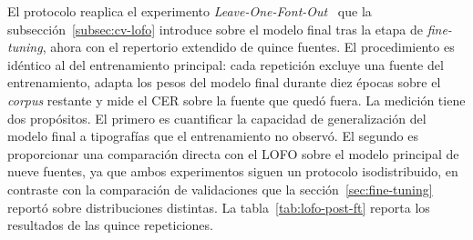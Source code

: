 El protocolo reaplica el experimento \textit{Leave-One-Font-Out}~\cite{etter2019synthrecipe} que la subsección~\ref{subsec:cv-lofo} introduce sobre el modelo final tras la etapa de \textit{fine-tuning}, ahora con el repertorio extendido de quince fuentes. El procedimiento es idéntico al del entrenamiento principal: cada repetición excluye una fuente del entrenamiento, adapta los pesos del modelo final durante diez épocas sobre el \textit{corpus} restante y mide el CER sobre la fuente que quedó fuera. La medición tiene dos propósitos. El primero es cuantificar la capacidad de generalización del modelo final a tipografías que el entrenamiento no observó. El segundo es proporcionar una comparación directa con el LOFO sobre el modelo principal de nueve fuentes, ya que ambos experimentos siguen un protocolo isodistribuido, en contraste con la comparación de validaciones que la sección~\ref{sec:fine-tuning} reportó sobre distribuciones distintas. La tabla~\ref{tab:lofo-post-ft} reporta los resultados de las quince repeticiones.

